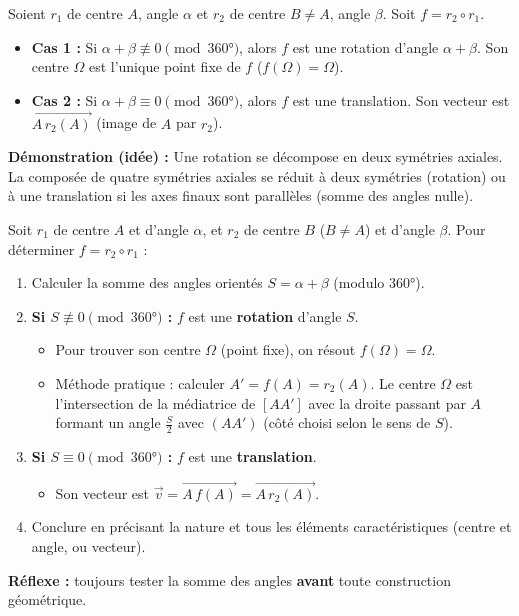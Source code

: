 \documentclass[11pt]{article}
\newcommand{\cle}[1]{{\popxbold\color{popdark}#1}}
\begin{document}
\begin{propriete}
Soient $r_1$ de centre $A$, angle $\alpha$ et $r_2$ de centre $B \neq A$, angle $\beta$. Soit $f = r_2 \circ r_1$.
\begin{itemize}
\item \textbf{Cas 1 :} Si $\alpha + \beta \not\equiv 0 \pmod{360°}$, alors $f$ est une \cle{rotation} d'angle $\alpha + \beta$. Son centre $\Omega$ est l'unique point fixe de $f$ ($f(\Omega)=\Omega$).
\item \textbf{Cas 2 :} Si $\alpha + \beta \equiv 0 \pmod{360°}$, alors $f$ est une \cle{translation}. Son vecteur est $\overrightarrow{A\, r_2(A)}$ (image de $A$ par $r_2$).
\end{itemize}
\textbf{Démonstration (idée) :} Une rotation se décompose en deux symétries axiales. La composée de quatre symétries axiales se réduit à deux symétries (rotation) ou à une translation si les axes finaux sont parallèles (somme des angles nulle).
\end{propriete}

\begin{methode}
Soit $r_1$ de centre $A$ et d'angle $\alpha$, et $r_2$ de centre $B$ ($B \neq A$) et d'angle $\beta$. Pour déterminer $f = r_2 \circ r_1$ :
\begin{enumerate}
\item Calculer la somme des angles orientés $S = \alpha + \beta$ (modulo $360°$).
\item \textbf{Si $S \not\equiv 0 \pmod{360°}$ :} $f$ est une \textbf{rotation} d'angle $S$.
      \begin{itemize}
      \item Pour trouver son centre $\Omega$ (point fixe), on résout $f(\Omega)=\Omega$.
      \item Méthode pratique : calculer $A' = f(A) = r_2(A)$. Le centre $\Omega$ est l'intersection de la médiatrice de $[AA']$ avec la droite passant par $A$ formant un angle $\frac{S}{2}$ avec $(AA')$ (côté choisi selon le sens de $S$).
      \end{itemize}
\item \textbf{Si $S \equiv 0 \pmod{360°}$ :} $f$ est une \textbf{translation}.
      \begin{itemize}
      \item Son vecteur est $\vec{v} = \overrightarrow{A\, f(A)} = \overrightarrow{A\, r_2(A)}$.
      \end{itemize}
\item Conclure en précisant la nature et tous les éléments caractéristiques (centre et angle, ou vecteur).
\end{enumerate}
\textbf{Réflexe :} toujours tester la somme des angles \textbf{avant} toute construction géométrique.
\end{methode}
\end{document}
